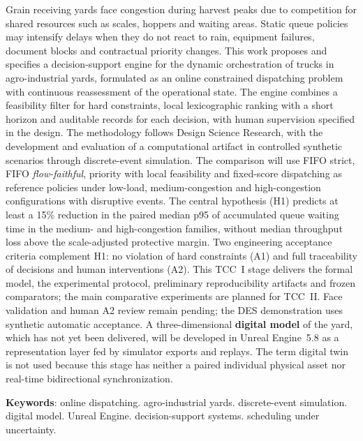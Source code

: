 \documentclass[
  12pt,
  oneside,
  a4paper,
  sumario=tradicional,
  brazil
]{abntex2}
\begin{document}
\begin{resumo}[Abstract]
  Grain receiving yards face congestion during harvest peaks due to competition for shared
  resources such as scales, hoppers and waiting areas. Static queue policies may intensify
  delays when they do not react to rain, equipment failures, document blocks and contractual
  priority changes. This work proposes and specifies a decision-support engine for the dynamic
  orchestration of trucks in agro-industrial yards, formulated as an online constrained
  dispatching problem with continuous reassessment of the operational state. The engine combines
  a feasibility filter for hard constraints, local lexicographic ranking with a short horizon and
  auditable records for each decision, with human supervision specified in the design. The methodology follows
  Design Science Research, with the development and evaluation of a computational artifact in
  controlled synthetic scenarios through discrete-event simulation. The comparison will use
  FIFO strict, FIFO \textit{flow-faithful}, priority with local feasibility and fixed-score
  dispatching as reference policies under low-load, medium-congestion and high-congestion
  configurations with disruptive events. The central hypothesis (H1) predicts at least a
  15\% reduction in the paired median p95 of accumulated queue waiting time in the medium-
  and high-congestion families, without median throughput loss above the scale-adjusted
  protective margin. Two engineering acceptance criteria complement H1: no violation of hard
  constraints (A1) and full traceability of decisions and human interventions (A2). This
  TCC~I stage delivers the formal model, the experimental protocol, preliminary
  reproducibility artifacts and frozen comparators; the main comparative experiments are
  planned for TCC~II. Face validation and human A2 review remain pending; the DES
  demonstration uses synthetic automatic acceptance. A three-dimensional \textbf{digital model}
  of the yard, which has not yet been delivered, will be
  developed in Unreal Engine~5.8 as a representation layer fed by simulator exports and
  replays. The term digital twin is not used because this stage has neither a paired
  individual physical asset nor real-time bidirectional synchronization.

  \vspace{\onelineskip}
  {\RaggedRight
  \textbf{Keywords}: online dispatching. agro-industrial yards.
  discrete-event simulation. digital model. Unreal Engine. decision-support systems.
  scheduling under uncertainty.
  \par}
\end{resumo}
\end{document}
